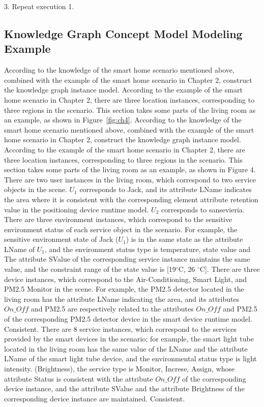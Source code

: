3. Repeat execution 1.

\subsection{Knowledge Graph Concept Model Modeling Example}

According to the knowledge of the smart home scenario mentioned above, combined with the example of the smart home scenario in Chapter 2, construct the knowledge graph instance model. According to the example of the smart home scenario in Chapter 2, there are three location instances, corresponding to three regions in the scenario. This section takes some parts of the living room as an example, as shown in Figure~\ref{fig:ch4}.
According to the knowledge of the smart home scenario mentioned above, combined with the example of the smart home scenario in Chapter 2, construct the knowledge graph instance model. According to the example of the smart home scenario in Chapter 2, there are three location instances, corresponding to three regions in the scenario. This section takes some parts of the living room as an example, as shown in Figure 4.
There are two user instances in the living room, which correspond to two service objects in the scene. $U_{1}$ corresponds to Jack, and its attribute LName indicates the area where it is consistent with the corresponding element attribute retention value in the positioning device runtime model. $U_{2}$ corresponds to sansevieria. There are three environment instances, which correspond to the sensitive environment status of each service object in the scenario. For example, the sensitive environment state of Jack ($U_{1}$) is in the same state as the attribute LName of $U_{1}$, and the environment status type is temperature, state value and The attribute SValue of the corresponding service instance maintains the same value, and the constraint range of the state value is [19$^{\circ}$C, 26 $^{\circ}$C]. There are three device instances, which correspond to the Air-Conditioning, Smart Light, and PM2.5 Monitor in the scene. For example, the PM2.5 detector located in the living room has the attribute LName indicating the area, and its attributes $On\_Off$ and PM2.5 are respectively related to the attributes $On\_Off$ and PM2.5 of the corresponding PM2.5 detector device in the smart device runtime model. Consistent. There are 8 service instances, which correspond to the services provided by the smart devices in the scenario; for example, the smart light tube located in the living room has the same value of the LName and the attribute LName of the smart light tube device, and the environmental status type is light intensity. (Brightness), the service type is Monitor, Increse, Assign, whose attribute Status is consistent with the attribute $On\_Off$ of the corresponding device instance, and the attribute SValue and the attribute Brightness of the corresponding device instance are maintained. Consistent.
